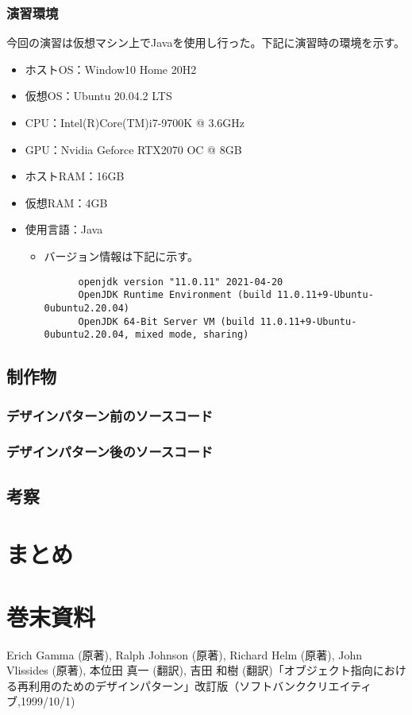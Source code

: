 \documentclass[dvipdfmx]{jsarticle}
\begin{document}
\subsubsection{演習環境}
今回の演習は仮想マシン上でJavaを使用し行った。下記に演習時の環境を示す。
\begin{itemize}
  \item ホストOS：Window10 Home 20H2
  \item 仮想OS：Ubuntu 20.04.2 LTS
  \item CPU：Intel(R)Core(TM)i7-9700K @ 3.6GHz
  \item GPU：Nvidia Geforce RTX2070 OC @ 8GB
  \item ホストRAM：16GB
  \item 仮想RAM：4GB
  \item 使用言語：Java
  \begin{itemize}
    \item バージョン情報は下記に示す。
    \begin{verbatim}
      openjdk version "11.0.11" 2021-04-20
      OpenJDK Runtime Environment (build 11.0.11+9-Ubuntu-0ubuntu2.20.04)
      OpenJDK 64-Bit Server VM (build 11.0.11+9-Ubuntu-0ubuntu2.20.04, mixed mode, sharing)
    \end{verbatim}
  \end{itemize}
\end{itemize}

\subsection{制作物}
\subsubsection{デザインパターン前のソースコード}
\subsubsection{デザインパターン後のソースコード}
\subsection{考察}
\section{まとめ}
\section{巻末資料}
\begin{thebibliography}{99}
    Erich Gamma (原著), Ralph Johnson (原著), Richard Helm (原著), John Vlissides (原著), 本位田 真一 (翻訳), 吉田 和樹 (翻訳)「オブジェクト指向における再利用のためのデザインパターン」改訂版（ソフトバンククリエイティブ,1999/10/1)
\end{thebibliography}
\end{document}
